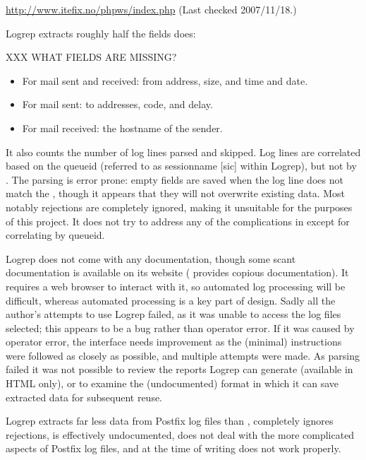 \noindent{}\url{http://www.itefix.no/phpws/index.php} \newline{}
(Last checked 2007/11/18.)

Logrep extracts roughly half the fields \parsername{} does:

XXX WHAT FIELDS ARE MISSING\@?

\begin{itemize}

    \item For mail sent and received: from address, size, and time and
        date.

    \item For mail sent: to addresses, \SMTP{} code, and delay.

    \item For mail received: the hostname of the sender.

\end{itemize}

It also counts the number of log lines parsed and skipped.  Log lines are
correlated based on the queueid (referred to as sessionname [sic] within
Logrep), but not by \pid{}.  The parsing is error prone: empty fields are
saved when the log line does not match the \regex{}, though it appears that
they will not overwrite existing data.  Most notably rejections are
completely ignored, making it unsuitable for the purposes of this project.
It does not try to address any of the complications in
 except for correlating by queueid.

Logrep does not come with any documentation, though some scant
documentation is available on its website (\parsername{} provides copious
documentation).  It requires a web browser to interact with it, so
automated log processing will be difficult, whereas automated processing is
a key part of \parsernames{} design.  Sadly all the author's attempts to
use Logrep failed, as it was unable to access the log files selected; this
appears to be a bug rather than operator error.  If it was caused by
operator error, the interface needs improvement as the (minimal)
instructions were followed as closely as possible, and multiple attempts
were made.  As parsing failed it was not possible to review the reports
Logrep can generate (available in HTML only), or to examine the
(undocumented) format in which it can save extracted data for subsequent
reuse.

Logrep extracts far less data from Postfix log files than \parsername{},
completely ignores rejections, is effectively undocumented, does not deal
with the more complicated aspects of Postfix log files, and at the time of
writing does not work properly.


